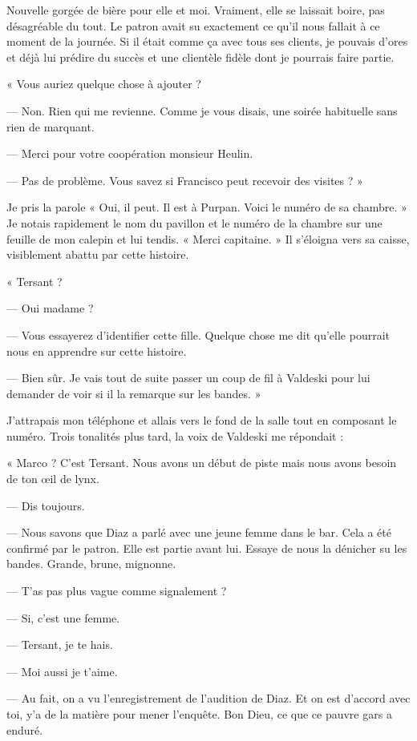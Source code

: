 Nouvelle gorgée de bière pour elle et moi. Vraiment, elle se laissait boire, pas désagréable du tout. Le patron avait 
su exactement ce qu'il nous fallait à ce moment de la journée. Si il était comme ça avec tous ses clients, je pouvais 
d'ores et déjà lui prédire du succès et une clientèle fidèle dont je pourrais faire partie.

« Vous auriez quelque chose à ajouter ?

— Non. Rien qui me revienne. Comme je vous disais, une soirée habituelle sans rien de marquant.

— Merci pour votre coopération monsieur Heulin.

— Pas de problème. Vous savez si Francisco peut recevoir des visites ? »

Je pris la parole « Oui, il peut. Il est à Purpan. Voici le numéro de sa chambre. » Je notais rapidement le nom du 
pavillon et le numéro de la chambre sur une feuille de mon calepin et lui tendis. « Merci capitaine. » Il s'éloigna 
vers sa caisse, visiblement abattu par cette histoire.

« Tersant ?

— Oui madame ?

— Vous essayerez d'identifier cette fille. Quelque chose me dit qu'elle pourrait nous en apprendre sur cette histoire.

— Bien sûr. Je vais tout de suite passer un coup de fil à Valdeski pour lui demander de voir si il la remarque sur les 
bandes. »

J'attrapais mon téléphone et allais vers le fond de la salle tout en composant le numéro. Trois tonalités plus tard, la 
voix de Valdeski me répondait :

« Marco ? C'est Tersant. Nous avons un début de piste mais nous avons besoin de ton œil de lynx.

— Dis toujours.

— Nous savons que Diaz a parlé avec une jeune femme dans le bar. Cela a été confirmé par le patron. Elle est partie 
avant lui. Essaye de nous la dénicher su les bandes. Grande, brune, mignonne.

— T'as pas plus vague comme signalement ?

— Si, c'est une femme.

— Tersant, je te hais.

— Moi aussi je t'aime.

— Au fait, on a vu l'enregistrement de l'audition de Diaz. Et on est d'accord avec toi, y'a de la matière pour mener 
l'enquête. Bon Dieu, ce que ce pauvre gars a enduré.

